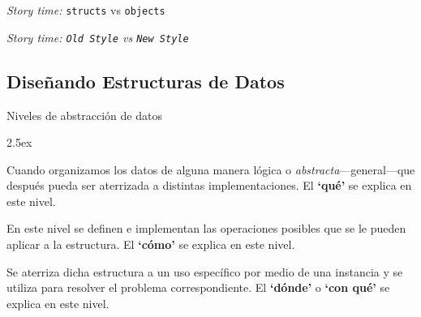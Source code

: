 \documentclass[spanish, c]{beamer}
\begin{document}
\begin{frame}[plain]
    \begin{center}
        \Huge
        \textit{Story time:} \texttt{structs} vs \texttt{objects} \pause

        \vspace{5ex}

        \textit{Story time: \texttt{Old Style} vs \texttt{New Style}}
    \end{center}
\end{frame}

\subsection{Diseñando Estructuras de Datos}

\begin{frame}{Niveles de abstracción de datos}

    \begin{description}[style=unboxed]
        \itemsep2.5ex
        \item [Abstracción.] Cuando organizamos los datos de alguna manera \alert{lógica} o \textit{abstracta}---general---que después pueda ser aterrizada a distintas implementaciones. El \textbf{`qué'} se explica en este nivel.
        \item [Implementación.] En este nivel se definen e \alert{implementan} las operaciones posibles que se le pueden aplicar a la estructura. El \textbf{`cómo'} se explica en este nivel.
        \item [Aplicación.] Se aterriza dicha estructura a un uso específico por medio de una \alert{instancia} y se utiliza para resolver el problema correspondiente. El \textbf{`dónde'} o \textbf{`con qué'} se explica en este nivel.
    \end{description}
\end{frame}
\end{document}
